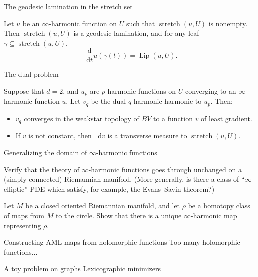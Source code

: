 \documentclass[10pt]{beamer}
\newcommand*\dif{\mathop{}\!\mathrm{d}}
\DeclareMathOperator{\Lip}{Lip}
\DeclareMathOperator{\Stretch}{stretch}
\begin{document}
\begin{frame}{The geodesic lamination in the stretch set}
\begin{theorem}
Let $u$ be an $\infty$-harmonic function on $U$ such that $\Stretch(u, U)$ is nonempty.
Then $\Stretch(u, U)$ is a geodesic lamination, and for any leaf $\gamma \subseteq \Stretch(u, U)$,
$$\frac{\dif}{\dif t} u(\gamma(t)) = \Lip(u, U).$$
\end{theorem}
\end{frame}

\begin{frame}{The dual problem}
\begin{theorem}
Suppose that $d = 2$, and $u_p$ are $p$-harmonic functions on $U$ converging to an $\infty$-harmonic function $u$.
Let $v_q$ be the dual $q$-harmonic harmonic to $u_p$.
Then:
\begin{itemize}
\item $v_q$ converges in the weakstar topology of $BV$ to a function $v$ of least gradient.
\item If $v$ is not constant, then $\dif v$ is a transverse measure to $\Stretch(u, U)$.
\end{itemize}
\end{theorem}
\end{frame}

\begin{frame}{Generalizing the domain of $\infty$-harmonic functions}
\begin{problem}
Verify that the theory of $\infty$-harmonic functions goes through unchanged on a (simply connected) Riemannian manifold.
(More generally, is there a class of ``$\infty$-elliptic'' PDE which satisfy, for example, the Evans--Savin theorem?)
\end{problem}

\begin{problem}
Let $M$ be a closed oriented Riemannian manifold, and let $\rho$ be a homotopy class of maps from $M$ to the circle.
Show that there is a unique $\infty$-harmonic map representing $\rho$.
\end{problem}
\end{frame}

\begin{frame}{Constructing AML maps from holomorphic functions}
    Too many holomorphic functions...
\end{frame}

\begin{frame}{A toy problem on graphs}
    Lexicographic minimizers
\end{frame}
\end{document}
